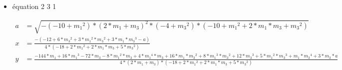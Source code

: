 \documentclass[a4paper, 8pt]{article}
\begin{document}
\begin{itemize}[label=$\bullet$]
\item équation 2 3 1

\begin{equation} \label{3}
   	\begin{split}
	  a & = \sqrt{-(-10+{{m}_{1}}^{2})*{(2*{m}_{1}+{m}_{3})}^{2}*(-4+{{m}_{3}}^{2})*(-10+{{m}_{1}}^{2}+2*{m}_{1}*{m}_{3}+{{m}_{3}}^{2})}\\
	  x & = \frac{-(-12+6*{{m}_{3}}^{2}+3*{{m}_{1}}^{2}*{{m}_{3}}^{2}+3*{m}_{1}*{{m}_{3}}^{3}-a)}{4*(-18+2*{{m}_{1}}^{2}+2*{m}_{1}*{m}_{3}+5*{{m}_{3}}^{2})} \\
   		y & = \frac{-144*{m}_{1}+16*{{m}_{1}}^{3}-72*{m}_{3}-8*{{m}_{1}}^{2}*{m}_{3}+4*{{m}_{1}}^{4}*{m}_{3}+16*{m}_{1}*{{m}_{3}}^{2}+8*{{m}_{1}}^{3}*{{m}_{3}}^{2}+12*{{m}_{3}}^{3}+5*{{m}_{1}}^{2}*{{m}_{3}}^{3}+{m}_{1}*{{m}_{3}}^{4}+3*{m}_{3}*a}{4*(2*{m}_{1}+{m}_{3})*(-18+2*{{m}_{1}}^{2}+2*{m}_{1}*{m}_{3}+5*{{m}_{3}}^{2})}
   	\end{split}
\end{equation}
\end{itemize}
\end{document}
